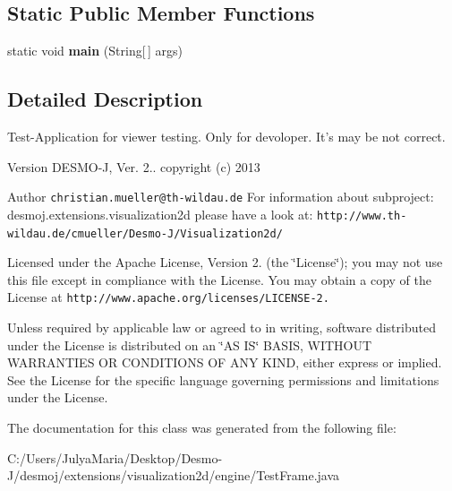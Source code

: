 \subsection*{Static Public Member Functions}
\begin{DoxyCompactItemize}
\item 
static void {\bfseries main} (String[$\,$] args)\label{classdesmoj_1_1extensions_1_1visualization2d_1_1engine_1_1_test_frame_a15f226a39f26d8e512693aad3fbea075}

\end{DoxyCompactItemize}


\subsection{Detailed Description}
Test-\/\-Application for viewer testing. Only for devoloper. It's may be not correct.

\begin{DoxyVersion}{Version}
D\-E\-S\-M\-O-\/\-J, Ver. 2.. copyright (c) 2013 
\end{DoxyVersion}
\begin{DoxyAuthor}{Author}
{\tt christian.\-mueller@th-\/wildau.\-de} For information about subproject\-: desmoj.\-extensions.\-visualization2d please have a look at\-: {\tt http\-://www.\-th-\/wildau.\-de/cmueller/\-Desmo-\/\-J/\-Visualization2d/}
\end{DoxyAuthor}
Licensed under the Apache License, Version 2. (the \char`\"{}\-License\char`\"{}); you may not use this file except in compliance with the License. You may obtain a copy of the License at {\tt http\-://www.\-apache.\-org/licenses/\-L\-I\-C\-E\-N\-S\-E-\/2.}

Unless required by applicable law or agreed to in writing, software distributed under the License is distributed on an \char`\"{}\-A\-S I\-S\char`\"{} B\-A\-S\-I\-S, W\-I\-T\-H\-O\-U\-T W\-A\-R\-R\-A\-N\-T\-I\-E\-S O\-R C\-O\-N\-D\-I\-T\-I\-O\-N\-S O\-F A\-N\-Y K\-I\-N\-D, either express or implied. See the License for the specific language governing permissions and limitations under the License. 

The documentation for this class was generated from the following file\-:\begin{DoxyCompactItemize}
\item 
C\-:/\-Users/\-Julya\-Maria/\-Desktop/\-Desmo-\/\-J/desmoj/extensions/visualization2d/engine/Test\-Frame.\-java\end{DoxyCompactItemize}
